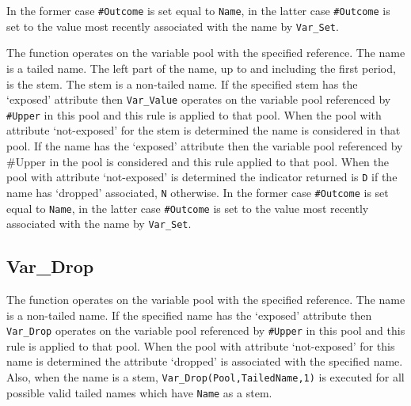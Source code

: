 In the former case \texttt{\#Outcome} is set equal to \texttt{Name}, in
the latter case \texttt{\#Outcome} is set to the value most recently
associated with the name by \texttt{Var\_Set}.



The function operates on the variable pool with the specified reference.
The name is a tailed name. The left part of the name, up to and
including the first period, is the stem. The stem is a non-tailed name.
If the specified stem has the `exposed' attribute then
\texttt{Var\_Value} operates on the variable pool referenced by
\texttt{\#Upper} in this pool and this rule is applied to that pool.
When the pool with attribute `not-exposed' for the stem is determined
the name is considered in that pool. If the name has the `exposed'
attribute then the variable pool referenced by \#Upper in the pool is
considered and this rule applied to that pool. When the pool with
attribute `not-exposed' is determined the indicator returned is
\texttt{\textquotesingle{}D\textquotesingle{}} if the name has `dropped'
associated, \texttt{\textquotesingle{}N\textquotesingle{}} otherwise. In
the former case \texttt{\#Outcome} is set equal to \texttt{Name}, in the
latter case \texttt{\#Outcome} is set to the value most recently
associated with the name by \texttt{Var\_Set}.

\subsection{Var\_Drop}\label{var_drop}



The function operates on the variable pool with the specified reference.
The name is a non-tailed name. If the specified name has the `exposed'
attribute then \texttt{Var\_Drop} operates on the variable pool
referenced by \texttt{\#Upper} in this pool and this rule is applied to
that pool. When the pool with attribute `not-exposed' for this name is
determined the attribute `dropped' is associated with the specified
name. Also, when the name is a stem,
\texttt{Var\_Drop(Pool,TailedName,\textquotesingle{}1\textquotesingle{})}
is executed for all possible valid tailed names which have \texttt{Name}
as a stem.



